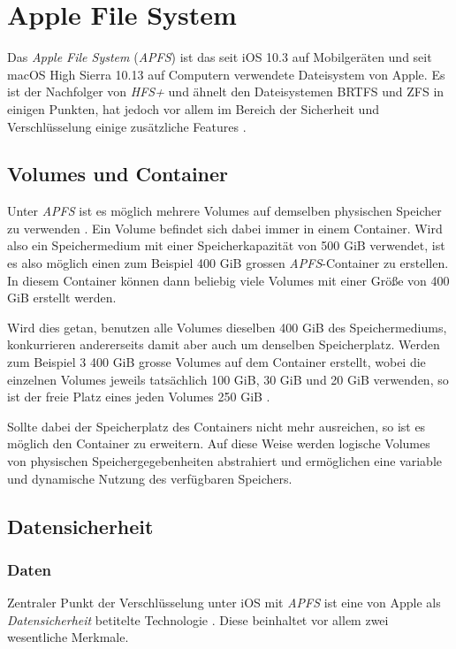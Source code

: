 \section{Apple File System}
Das \textit{Apple File System} (\textit{APFS}) ist das seit iOS 10.3 auf
Mobilgeräten und seit macOS High Sierra 10.13 auf Computern verwendete
Dateisystem von Apple. Es ist der Nachfolger von \textit{HFS+} und ähnelt den
Dateisystemen BRTFS und ZFS in einigen Punkten, hat jedoch vor allem im Bereich
der Sicherheit und Verschlüsselung einige zusätzliche Features \cite{golem,
apple_filesystem_reference}.

\subsection{Volumes und Container}
Unter \textit{APFS} ist es möglich mehrere Volumes auf demselben physischen
Speicher zu verwenden \cite{about_apfs}. Ein Volume befindet sich dabei immer in
einem Container. Wird also ein Speichermedium mit einer Speicherkapazität von
500 GiB verwendet, ist es also möglich einen zum Beispiel 400 GiB grossen
\textit{APFS}-Container zu erstellen. In diesem Container können dann beliebig
viele Volumes mit einer Größe von 400 GiB erstellt werden.

Wird dies getan, benutzen alle Volumes dieselben 400 GiB des Speichermediums,
konkurrieren andererseits damit aber auch um denselben Speicherplatz. Werden zum
Beispiel 3 400 GiB grosse Volumes auf dem Container erstellt, wobei die
einzelnen Volumes jeweils tatsächlich 100 GiB, 30 GiB und 20 GiB verwenden, so
ist der freie Platz eines jeden Volumes 250 GiB \cite{golem}.

Sollte dabei der Speicherplatz des Containers nicht mehr ausreichen, so ist es
möglich den Container zu erweitern.  Auf diese Weise werden logische Volumes von
physischen Speichergegebenheiten abstrahiert und ermöglichen eine variable und
dynamische Nutzung des verfügbaren Speichers.

\subsection{Datensicherheit}

\subsubsection{Daten}
Zentraler Punkt der Verschlüsselung unter iOS mit \textit{APFS} ist eine von
Apple als \textit{Datensicherheit} betitelte Technologie \cite[S. 48
ff]{apple2020}. Diese beinhaltet vor allem zwei wesentliche Merkmale.


